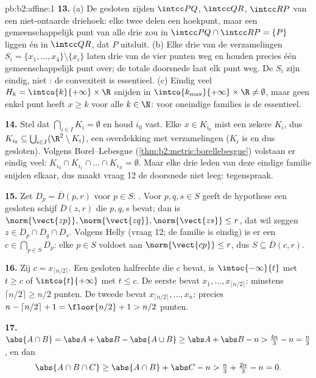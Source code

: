 \begin{solution}{pb:b2:affine:1}
\textbf{13.} (a) De gesloten zijden $\intcc PQ$, $\intcc QR$,
$\intcc RP$ van een niet-ontaarde driehoek: elke twee delen een
hoekpunt, maar een gemeenschappelijk punt van alle drie zou in
$\intcc PQ \cap \intcc RP = \{P\}$ liggen én in $\intcc QR$, dat
$P$ uitsluit. (b) Elke drie van de verzamelingen $S_i = \{x_1,
\dots, x_4\} \setminus \{x_i\}$ laten drie van de vier punten weg
en houden precies één gemeenschappelijk punt over; de totale
doorsnede laat elk punt weg. De $S_i$ zijn eindig, niet : de
convexiteit is essentieel. (c) Eindig veel $H_k =
\intco{k}{+\infty} \times \R$ snijden in $\intco{k_{\max}}{+\infty}
\times \R \neq \emptyset$, maar geen enkel punt heeft $x \geq k$
voor alle $k \in \N$: voor oneindige families is de 
essentieel.

\textbf{14.} Stel dat $\bigcap_{i \in I}K_i = \emptyset$ en houd
$i_0$ vast. Elke $x \in K_{i_0}$ mist een zekere $K_i$, dus
$K_{i_0} \subseteq \bigcup_{i \in I}(\R^2 \setminus K_i)$, een
overdekking met  verzamelingen ($K_i$ is  en dus
gesloten). Volgens Borel--Lebesgue
(\cref{thm:b2:metric:borellebesgue}) volstaan er eindig veel:
$K_{i_0} \cap K_{i_1} \cap \dots \cap K_{i_N} = \emptyset$. Maar
elke drie leden van deze eindige familie 
snijden elkaar, dus maakt vraag 12 de doorsnede niet leeg:
tegenspraak.

\textbf{15.} Zet $D_p = \overline D(p, r)$ voor $p \in S$: 
. Voor $p, q, s \in S$ geeft de hypothese een
gesloten schijf $\overline D(z, r)$ die $p, q, s$ bevat; dan is
$\norm{\vect{zp}}, \norm{\vect{zq}}, \norm{\vect{zs}} \leq r$, dat
wil zeggen $z \in D_p \cap D_q \cap D_s$. Volgens Helly (vraag 12;
de familie is eindig) is er een $c \in \bigcap_{p \in S}D_p$: elke
$p \in S$ voldoet aan $\norm{\vect{cp}} \leq r$, dus $S \subseteq
\overline D(c, r)$.

\textbf{16.} Zij $c = x_{\lceil n/2\rceil}$. Een gesloten
halfrechte die $c$ bevat, is $\intoc{-\infty}{t}$ met $t \geq c$ of
$\intco{t}{+\infty}$ met $t \leq c$. De eerste bevat $x_1, \dots,
x_{\lceil n/2\rceil}$: minstens $\lceil n/2\rceil \geq n/2$
punten. De tweede bevat $x_{\lceil n/2\rceil}, \dots, x_n$: precies
$n - \lceil n/2\rceil + 1 = \floor{n/2} + 1 > n/2$ punten.

\textbf{17.} $\abs{A \cap B} = \abs A + \abs B - \abs{A \cup B}
\geq \abs A + \abs B - n > \tfrac{4n}3 - n = \tfrac n3$, en dan
\[
\abs{A \cap B \cap C} \geq \abs{A \cap B} + \abs C - n >
\tfrac n3 + \tfrac{2n}3 - n = 0 .
\]


\end{solution}
